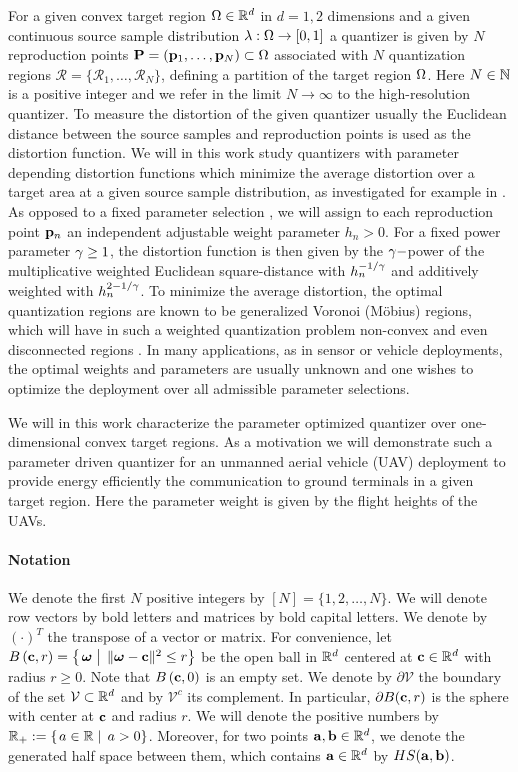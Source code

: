 \documentclass[smallabstract,smallcaptions]{dccpaper}
\newcounter{example}[section]
\newcommand{\Ball}{\ensuremath{B}}          %
\newcommand{\Vor}{\ensuremath{\mathcal{V}}}         %
\newcommand{\Rset}{\ensuremath{\mathcal R}}
\newcommand{\philippstart}{\color{black}}
\newcommand{\philippend}{\color{black}}
\begin{document}
%
For a given convex target region $\Omega\in{\ensuremath{\mathbb R}}^d$ in $d=1,2$ dimensions and a given continuous source sample distribution
$\lambda:\Omega\to [0,1]$ a quantizer is given by $N$ reproduction points $\mathbf P =({\mathbf p}_1,\dots,{\mathbf p}_N)\subset \Omega$ associated with
$N$ quantization regions $\Rset=\{\Rset_1,\dots,\Rset_N\}$, defining a partition of the target region $\Omega$. Here
$N\in{\ensuremath{\mathbb N}}$ is a positive integer and we refer in the limit $N\to\infty$ to the high-resolution quantizer.  To measure the
distortion of the given quantizer usually the Euclidean distance between the source samples and reproduction points is
used as the distortion function. We will in this work study  quantizers with parameter depending distortion functions
which minimize the average distortion over a target area at a given source sample distribution, as investigated for
example in \cite{KJ16b,KJ17}.
%
As opposed to a fixed parameter selection \cite{KSS18}, we will assign to each reproduction point ${\mathbf p}_n$ an
independent adjustable weight parameter $h_n>0$. For a fixed power parameter $\gamma\geq1$, the distortion function is
then given by the $\gamma-$power of the  multiplicative weighted Euclidean square-distance with $h_n^{-1/\gamma}$ and
additively weighted with $h_n^{2-1/\gamma}$. To minimize the average distortion, the optimal quantization regions are known
to be generalized Voronoi (Möbius) regions, which will have in such a weighted quantization problem non-convex and even
disconnected regions \cite{BWY07}. In many applications, as in sensor or vehicle deployments, the optimal weights and
parameters are usually unknown and one wishes to optimize the deployment over all admissible parameter selections.

We will in this work characterize the parameter optimized quantizer  over one-dimensional convex target
regions. As a motivation we will demonstrate such a parameter driven quantizer for an unmanned aerial vehicle (UAV) deployment
to provide energy efficiently the communication to ground terminals in a given target region. 
Here the parameter weight is given by the flight heights of the UAVs.  

\philippstart \paragraph{Notation} We denote the first
$N$ positive integers by $[N]=\{1,2,\dots,N\}$. We will denote row vectors by bold letters and
matrices by bold capital letters. We denote by $(\cdot)^T$ the transpose of a vector or matrix.
For convenience, let $\Ball\left(\vc,r\right)=\set{\vome}{\|\vome-\vc\|^2\le r}$ be the open ball in ${\mathbb R}^d$ centered at
${\mathbf c}\in{\ensuremath{\mathbb R}}^d$ with radius $r\geq 0$. Note that $\Ball\left(\vc,0\right)$ is an empty set. We denote by $\partial \Vor$ the
boundary of the set $\Vor\subset\R^d$ and by $\Vor^c$ its complement. In particular, $\partial \Ball(\vc,r)$ is the sphere
with center at ${\mathbf c}$ and radius $r$. We will denote the positive numbers by $\R_+:=\set{a\in\R}{a>0}$.
Moreover, for two points ${\mathbf a},{\mathbf b}\in{\ensuremath{\mathbb R}}^d$, we denote the generated half space between them, which contains ${\mathbf a}\in{\ensuremath{\mathbb R}}^d$
by $HS({\mathbf a}, {\mathbf b})$.  \philippend
\end{document}
